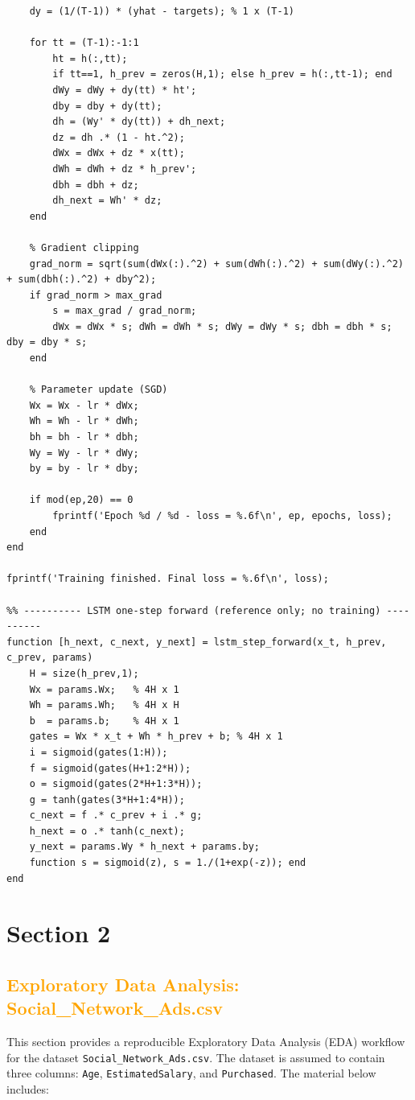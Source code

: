 \documentclass[11pt,a4paper]{article}
\begin{document}
\begin{verbatim}
    dy = (1/(T-1)) * (yhat - targets); % 1 x (T-1)

    for tt = (T-1):-1:1
        ht = h(:,tt);
        if tt==1, h_prev = zeros(H,1); else h_prev = h(:,tt-1); end
        dWy = dWy + dy(tt) * ht';
        dby = dby + dy(tt);
        dh = (Wy' * dy(tt)) + dh_next;
        dz = dh .* (1 - ht.^2);
        dWx = dWx + dz * x(tt);
        dWh = dWh + dz * h_prev';
        dbh = dbh + dz;
        dh_next = Wh' * dz;
    end

    % Gradient clipping
    grad_norm = sqrt(sum(dWx(:).^2) + sum(dWh(:).^2) + sum(dWy(:).^2) + sum(dbh(:).^2) + dby^2);
    if grad_norm > max_grad
        s = max_grad / grad_norm;
        dWx = dWx * s; dWh = dWh * s; dWy = dWy * s; dbh = dbh * s; dby = dby * s;
    end

    % Parameter update (SGD)
    Wx = Wx - lr * dWx;
    Wh = Wh - lr * dWh;
    bh = bh - lr * dbh;
    Wy = Wy - lr * dWy;
    by = by - lr * dby;

    if mod(ep,20) == 0
        fprintf('Epoch %d / %d - loss = %.6f\n', ep, epochs, loss);
    end
end

fprintf('Training finished. Final loss = %.6f\n', loss);

%% ---------- LSTM one-step forward (reference only; no training) ----------
function [h_next, c_next, y_next] = lstm_step_forward(x_t, h_prev, c_prev, params)
    H = size(h_prev,1);
    Wx = params.Wx;   % 4H x 1
    Wh = params.Wh;   % 4H x H
    b  = params.b;    % 4H x 1
    gates = Wx * x_t + Wh * h_prev + b; % 4H x 1
    i = sigmoid(gates(1:H));
    f = sigmoid(gates(H+1:2*H));
    o = sigmoid(gates(2*H+1:3*H));
    g = tanh(gates(3*H+1:4*H));
    c_next = f .* c_prev + i .* g;
    h_next = o .* tanh(c_next);
    y_next = params.Wy * h_next + params.by;
    function s = sigmoid(z), s = 1./(1+exp(-z)); end
end
\end{verbatim}



\section{Section 2}
\subsection{\textcolor{orange}{Exploratory Data Analysis: Social\_Network\_Ads.csv}}
This section provides a reproducible Exploratory Data Analysis (EDA) workflow for the dataset \texttt{Social\_Network\_Ads.csv}. The dataset is assumed to contain three columns: \texttt{Age}, \texttt{EstimatedSalary}, and \texttt{Purchased}. The material below includes:
\end{document}

